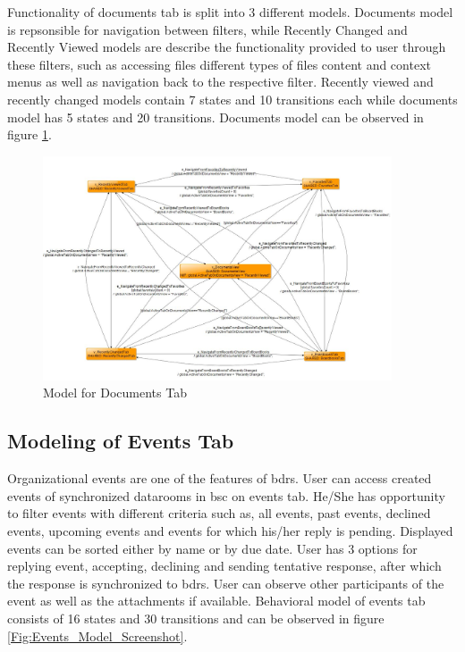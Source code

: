\par
Functionality of documents tab is split into 3 different models. Documents model is repsonsible for navigation between filters, while Recently Changed and Recently Viewed models are describe the functionality provided to user through these filters, such as accessing files different types of files content and context menus as well as navigation back to the respective filter. Recently viewed and recently changed models contain 7 states and 10 transitions each while documents model has 5 states and 20 transitions. Documents model can be observed in figure \ref{Fig:Documents_Model_Screenshot}. 

\begin{figure} [htbp!]
	\centering
					\includegraphics[width=0.92\textwidth]{figures/Documents_model_screenshot}
					\caption{\label{Fig:Documents_Model_Screenshot} Model for Documents Tab}
\end{figure}


\subsection{Modeling of Events Tab}
\par
Organizational events are one of the features of \acrshort{bdrs}. User can access created events of synchronized datarooms in \acrshort{bsc} on events tab. He/She has opportunity to filter events with different criteria such as, all events, past events, declined events, upcoming events and events for which his/her reply is pending. Displayed events can be sorted either by name or by due date. User has 3 options for replying event, accepting, declining and sending tentative response, after which the response is synchronized to \acrshort{bdrs}. User can observe other participants of the event as well as the attachments if available. Behavioral model of events tab consists of 16 states and 30 transitions and can be observed in figure \ref{Fig:Events_Model_Screenshot}.

